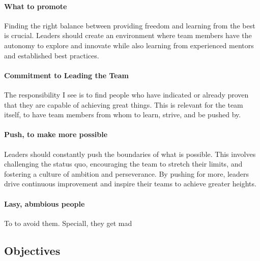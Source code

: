 \paragraph{What to promote}
Finding the right balance between providing freedom and learning from the best is crucial. Leaders should create an environment where team members have the autonomy to explore and innovate while also learning from experienced mentors and established best practices. 




\paragraph{Commitment to Leading the Team}

The responsibility I see is to find people who have indicated or already proven that they are capable of achieving great things. This is relevant for the team itself, to have team members from whom to learn, strive, and be pushed by.


\paragraph{Push, to make more possible}
Leaders should constantly push the boundaries of what is possible. This involves challenging the status quo, encouraging the team to stretch their limits, and fostering a culture of ambition and perseverance. By pushing for more, leaders drive continuous improvement and inspire their teams to achieve greater heights.

\paragraph{Lasy, abmbious people}
To to avoid them.
Speciall, they get mad

\subsection{Objectives}


